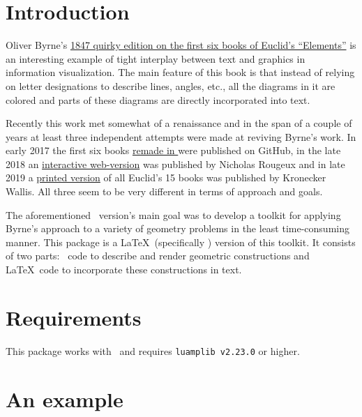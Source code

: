 \section{Introduction}
Oliver Byrne's \href{https://archive.org/details/firstsixbooksofe00byrn/}{1847 quirky edition on the first six books of Euclid's ``Elements''}\cite{Byrne1847} is an interesting example of tight interplay between text and graphics in information visualization. The main feature of this book is that instead of relying on letter designations to describe lines, angles, etc., all the diagrams in it are colored and parts of these diagrams are directly incorporated into text.

Recently this work met somewhat of a renaissance and in the span of a couple of years at least three independent attempts were made at reviving Byrne's work. In early 2017 the first six books \href{https://github.com/jemmybutton/byrne-euclid/}{remade in \ConTeXt} were published on GitHub\cite{Slyusarev2017}, in the late 2018 an \href{https://www.c82.net/euclid/}{interactive web-version} was published by Nicholas Rougeux\cite{Rougeux2019} and in late 2019 a \href{https://www.kroneckerwallis.com/product/euclids-elements-completing-oliver-byrnes-work/}{printed version} of all Euclid's 15 books was published by Kronecker Wallis. All three seem to be very different in terms of approach and goals.

The aforementioned \ConTeXt\ version's main goal was to develop a toolkit for applying Byrne's approach to a variety of geometry problems in the least time-consuming manner. This package is a \LaTeX\ (specifically \LuaLaTeX) version of this toolkit. It consists of two parts: \METAPOST\ code to describe and render geometric constructions and \LaTeX\ code to incorporate these constructions in text.

\section{Requirements}

This package works with \LuaLaTeX\ and requires \texttt{luamplib v2.23.0} or higher.
\section{An example}

